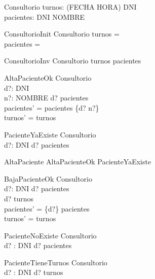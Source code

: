 \begin{zed}
\end{zed}

\begin{schema}{Consultorio}
turnos: (FECHA \cross HORA) \pfun DNI \\
pacientes: DNI \pfun NOMBRE
\end{schema}

\begin{schema}{ConsultorioInit}
Consultorio
\where
turnos = \emptyset \\
pacientes = \emptyset
\end{schema}

\begin{schema}{ConsultorioInv}
Consultorio
\where
\ran turnos \subseteq \dom pacientes
\end{schema}

\begin{schema}{AltaPacienteOk}
\Delta Consultorio \\
d?: DNI \\
n?: NOMBRE
\where
d? \notin \dom pacientes \\
pacientes' = pacientes \cup \{d? \mapsto n?\} \\
turnos' = turnos
\end{schema}

\begin{schema}{PacienteYaExiste}
\Xi Consultorio \\
d?: DNI
\where
d? \in \dom pacientes
\end{schema}

\begin{zed}
AltaPaciente  AltaPacienteOk \lor PacienteYaExiste
\end{zed}

\begin{schema}{BajaPacienteOk}
\Delta Consultorio \\
d?: DNI
\where
d? \in \dom pacientes \\
d? \notin \ran turnos \\
pacientes' = \{d?\} \ndres pacientes \\
turnos' = turnos
\end{schema}

\begin{schema}{PacienteNoExiste}
\Xi Consultorio \\
d? : DNI
\where
d? \notin \dom pacientes
\end{schema}

\begin{schema}{PacienteTieneTurnos}
\Xi Consultorio \\
d? : DNI
\where
d? \in \ran turnos
\end{schema}

